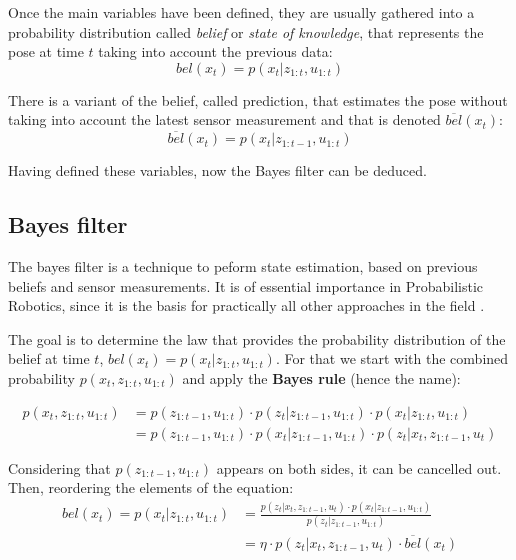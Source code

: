 Once the main variables have been defined, they are usually gathered into a probability distribution called \emph{belief} or \emph{state of knowledge}, that represents the pose at time $t$ taking into account the previous data:
\begin{equation}
  bel(x_t) = p(x_t|z_{1:t},u_{1:t})
  \label{eq:belief}
\end{equation}  

There is a variant of the belief, called prediction, that estimates the pose without taking into account the latest sensor measurement and that is denoted $\overline{bel}(x_t)$:
\begin{equation}
  \overline{bel}(x_t) = p(x_t|z_{1:t-1},u_{1:t})
  \label{eq:prediction}
\end{equation}  

Having defined these variables, now the Bayes filter can be deduced.

\subsection{Bayes filter}

The bayes filter is a technique to peform state estimation, based on previous beliefs and sensor measurements. It is of essential importance in Probabilistic Robotics, since it is the basis for practically all other approaches in the field .

The goal is to determine the law that provides the probability distribution of the belief at time $t$, $bel(x_t)=p(x_t|z_{1:t},u_{1:t})$. For that we start with the combined probability $p(x_t,z_{1:t},u_{1:t})$ and apply the \textbf{Bayes rule} (hence the name):

\begin{equation}
  \begin{split}
    p(x_t,z_{1:t},u_{1:t}) & = p(z_{1:t-1},u_{1:t})\cdot p(z_t|z_{1:t-1},u_{1:t})\cdot p(x_t|z_{1:t},u_{1:t})\\
                           & = p(z_{1:t-1},u_{1:t})\cdot p(x_t|z_{1:t-1},u_{1:t})\cdot p(z_t|x_t,z_{1:t-1},u_t)
  \end{split}  
  \label{eq:bayesded}
\end{equation}  

Considering that $p(z_{1:t-1},u_{1:t})$ appears on both sides, it can be cancelled out. Then, reordering the elements of the equation:
\begin{equation}
  \begin{split}
    bel(x_t) = p(x_t|z_{1:t},u_{1:t}) & = \frac{p(z_t|x_t,z_{1:t-1},u_t)\cdot p(x_t|z_{1:t-1},u_{1:t})}{p(z_t|z_{1:t-1},u_{1:t})} \\ 
                                      & = \eta\cdot p(z_t|x_t,z_{1:t-1},u_t)\cdot \overline{bel}(x_t)
  \end{split}
  \label{eq:bayes}
\end{equation} 

